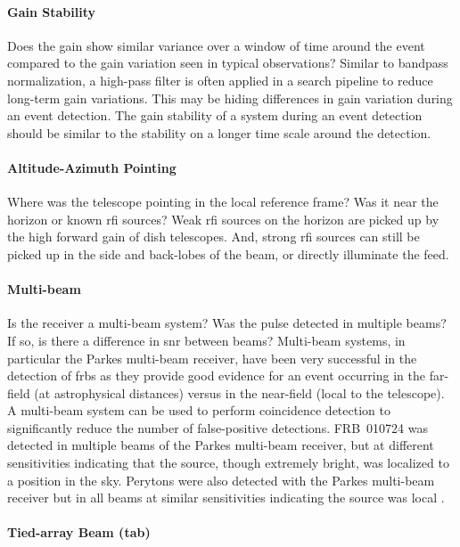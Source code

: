 \documentclass[a4paper,fleqn,usenatbib]{mnras}
\begin{document}
\paragraph{Gain Stability}

Does the gain show similar variance over a window of time around the event
compared to the gain variation seen in typical observations? Similar to bandpass
normalization, a high-pass filter is often applied in a search pipeline to
reduce long-term gain variations. This may be hiding differences in gain
variation during an event detection. The gain stability of a system during an
event detection should be similar to the stability on a longer time scale around
the detection.

\paragraph{Altitude-Azimuth Pointing}

Where was the telescope pointing in the local reference frame? Was it near the
horizon or known \gls{rfi} sources? Weak \gls{rfi} sources on the horizon are
picked up by the high forward gain of dish telescopes. And, strong \gls{rfi}
sources can still be picked up in the side and back-lobes of the beam, or
directly illuminate the feed.

\paragraph{Multi-beam}

Is the receiver a multi-beam system? Was the pulse detected in multiple beams?
If so, is there a difference in \gls{snr} between beams?  Multi-beam systems, in
particular the Parkes multi-beam receiver, have been very successful in the
detection of \glspl{frb} as they provide good evidence for an event occurring in
the far-field (at astrophysical distances) versus in the near-field (local to
the telescope).  A multi-beam system can be used to perform coincidence
detection to significantly reduce the number of false-positive detections.
FRB~010724 \citep{2007Sci...318..777L} was detected in multiple beams of the
Parkes multi-beam receiver, but at different sensitivities indicating that the
source, though extremely bright, was localized to a position in the sky.
Perytons were also detected with the Parkes multi-beam receiver but in all beams
at similar sensitivities indicating the source was local
\citep{2011ApJ...727...18B}.

\paragraph{Tied-array Beam (\gls{tab})}
\end{document}
